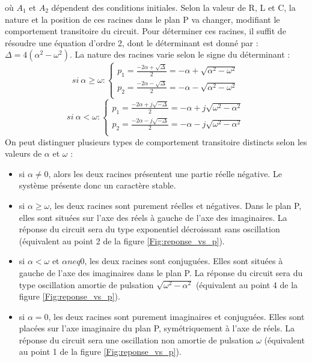 \documentclass[]{report}
\begin{document}
	 où $A_{1}$ et $A_{2}$ dépendent des conditions initiales. Selon la valeur de R, L et C, la nature et la position de ces racines dans le plan P va changer, modifiant le comportement transitoire du circuit. Pour déterminer ces racines, il suffit de résoudre une équation d'ordre 2, dont le déterminant est donné par : $\Delta = 4(\alpha^{2}-\omega^{2})$. La nature des racines varie selon le signe du déterminant :
	\begin{equation}
	si~\alpha \geq \omega : \left \{
		\begin{array}{l}
			p_{1}=\frac{-2\alpha +\sqrt{\Delta}}{2}=-\alpha+\sqrt{\alpha^{2}-\omega^{2}} \\
			p_{2}=\frac{-2\alpha -\sqrt{\Delta}}{2}=-\alpha-\sqrt{\alpha^{2}-\omega^{2}} \\
		\end{array}
	\right.
	\end{equation}
	\begin{equation}
	si~\alpha < \omega : \left \{
	\begin{array}{l}
	p_{1}=\frac{-2\alpha +j\sqrt{-\Delta}}{2}=-\alpha+j\sqrt{\omega^{2}-\alpha^{2}} \\
	p_{2}=\frac{-2\alpha -j\sqrt{-\Delta}}{2}=-\alpha-j\sqrt{\omega^{2}-\alpha^{2}} \\
	\end{array}
	\right.
	\end{equation}
	On peut distinguer plusieurs types de comportement transitoire distincts selon les valeurs de $\alpha$ et $\omega$ :
	\begin{itemize}
		\item si $\alpha \neq 0$, alors les deux racines présentent une partie réelle négative. Le système présente donc un caractère stable.
		\item si $\alpha \geq \omega$, les deux racines sont purement réelles et négatives. Dans le plan P, elles sont situées sur l'axe des réels à gauche de l'axe des imaginaires. La réponse du circuit sera du type exponentiel décroissant sans oscillation (équivalent au point 2 de la figure \ref{Fig:reponse_vs_p}).
		\item si $\alpha < \omega$ et $\alpha neq 0$, les deux racines sont conjuguées. Elles sont situées à gauche de l'axe des imaginaires dans le plan P. La réponse du circuit sera du type oscillation amortie de pulsation $\sqrt{\omega^{2}-\alpha^{2}}$ (équivalent au point 4 de la figure \ref{Fig:reponse_vs_p}). 
		\item si $\alpha = 0$, les deux racines sont purement imaginaires et conjuguées. Elles sont placées sur l'axe imaginaire du plan P, symétriquement à l'axe de réels. La réponse du circuit sera une oscillation non amortie de pulsation $\omega$ (équivalent au point 1 de la figure \ref{Fig:reponse_vs_p}). 
	\end{itemize}
	\vspace{1\baselineskip}
\end{document}
